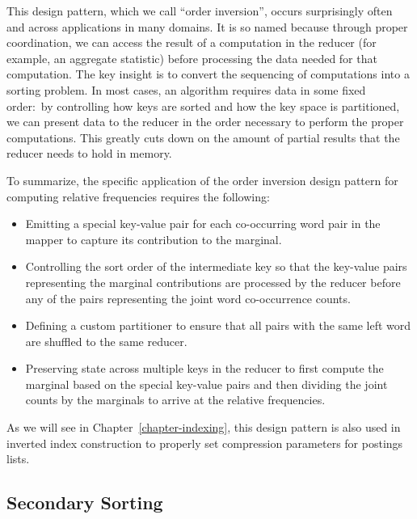 \documentclass[11pt]{article}
\begin{document}
This design pattern, which we call ``order inversion'', occurs
surprisingly often and across applications in many domains.  It is so
named because through proper coordination, we can access the result of
a computation in the reducer (for example, an aggregate statistic)
before processing the data needed for that computation.  The key
insight is to convert the sequencing of computations into a sorting
problem.  In most cases, an algorithm requires data in some fixed
order:\ by controlling how keys are sorted and how the key space is
partitioned, we can present data to the reducer in the order necessary
to perform the proper computations.  This greatly cuts down on the
amount of partial results that the reducer needs to hold in memory.

To summarize, the specific application of the order inversion design
pattern for computing relative frequencies requires the
following:

\begin{itemize}

\item Emitting a special key-value pair for each co-occurring word
  pair in the mapper to capture its contribution to the marginal.

\item Controlling the sort order of the intermediate key so that the
  key-value pairs representing the marginal contributions are
  processed by the reducer before any of the pairs representing the
  joint word co-occurrence counts.

\item Defining a custom partitioner to ensure that all pairs with the
  same left word are shuffled to the same reducer.

\item Preserving state across multiple keys in the reducer to first
  compute the marginal based on the special key-value pairs and then
  dividing the joint counts by the marginals to arrive at the
  relative frequencies.

\end{itemize}

\noindent As we will see in Chapter~\ref{chapter-indexing}, this design
pattern is also used in inverted index construction to properly set
compression parameters for postings lists.

\subsection{Secondary Sorting}
\label{chapter3:secondary-sorting}
\end{document}
